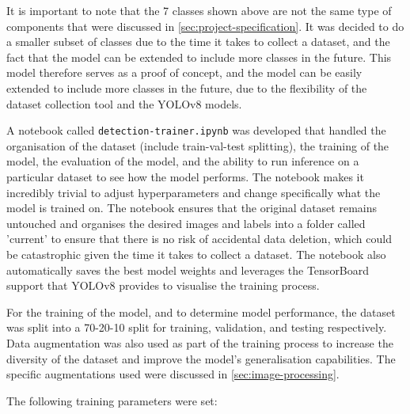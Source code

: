 It is important to note that the 7 classes shown above are not the same type of components that were discussed in \autoref{sec:project-specification}. It was decided to do a smaller subset of classes due to the time it takes to collect a dataset, and the fact that the model can be extended to include more classes in the future. This model therefore serves as a proof of concept, and the model can be easily extended to include more classes in the future, due to the flexibility of the dataset collection tool and the YOLOv8 models.

A notebook called \texttt{detection-trainer.ipynb} was developed that handled the organisation of the dataset (include train-val-test splitting), the training of the model, the evaluation of the model, and the ability to run inference on a particular dataset to see how the model performs. The notebook makes it incredibly trivial to adjust hyperparameters and change specifically what the model is trained on. The notebook ensures that the original dataset remains untouched and organises the desired images and labels into a folder called 'current' to ensure that there is no risk of accidental data deletion, which could be catastrophic given the time it takes to collect a dataset. The notebook also automatically saves the best model weights and leverages the TensorBoard support that YOLOv8 provides to visualise the training process.

For the training of the model, and to determine model performance, the dataset was split into a 70-20-10 split for training, validation, and testing respectively. Data augmentation was also used as part of the training process to increase the diversity of the dataset and improve the model's generalisation capabilities. The specific augmentations used were discussed in \autoref{sec:image-processing}. 

The following training parameters were set:

